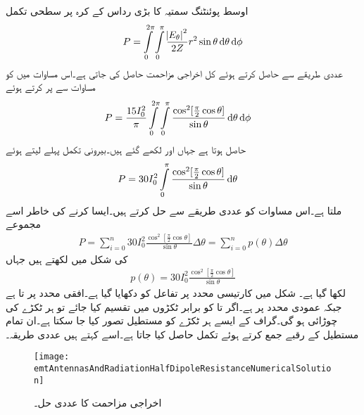 اوسط پوئنٹنگ سمتیہ کا بڑی رداس کے کرہ پر سطحی تکمل
\begin{align}
P=\int \limits_{0}^{2\pi}\int \limits_{0}^{\pi}  \frac{\abs{E_{\theta}}^2}{2 Z} r^2 \sin \theta \dif \theta \dif \phi
\end{align}
عددی طریقے سے حاصل کرتے ہوئے کل اخراجی مزاحمت   حاصل کی جاتی ہے۔اس مساوات میں  کو مساوات  سے پر کرتے ہوئے 
\begin{align*}
P&= \frac{15 I_0^2}{\pi}\int \limits_{0}^{2\pi}\int \limits_{0}^{\pi}  \frac{\cos^2 [\frac{\pi}{2} \cos \theta]}{\sin \theta} \dif \theta \dif \phi
\end{align*}
حاصل ہوتا ہے جہاں  اور  لکھے گئے ہیں۔بیرونی تکمل پہلے لیتے ہوئے
\begin{align}\label{مساوات_اینٹینا_نصف_طول_موج_اخراجی_طاقت_الف}
P&= 30 I_0^2\int \limits_{0}^{\pi}  \frac{\cos^2 [\frac{\pi}{2} \cos \theta]}{\sin \theta} \dif \theta
\end{align}
ملتا ہے۔اس مساوات کو عددی طریقے سے حل کرتے ہیں۔ایسا کرنے کی خاطر اسے مجموعے
\begin{align}
P=\sum_{i=0}^{n} 30 I_0^2  \frac{\cos^2 [\frac{\pi}{2} \cos \theta]}{\sin \theta} \Delta  \theta =\sum_{i=0}^{n} p(\theta) \Delta \theta
\end{align}
کی شکل میں لکھتے ہیں جہاں
\begin{align}\label{مساوات_اینٹینا_اخراجی_مزاحمت_عددی_الف}
p(\theta)=30 I_0^2  \frac{\cos^2 [\frac{\pi}{2} \cos \theta]}{\sin \theta}
\end{align}
لکھا گیا ہے۔ شکل  میں کارتیسی محدد پر  تفاعل   کو دکھایا گیا ہے۔افقی محدد پر  تا  ہے  جبکہ عمودی محدد پر  ہے۔اگر  تا  کو  برابر ٹکڑوں میں تقسیم کیا جائے تو ہر ٹکڑے کی چوڑائی  ہو گی۔گراف کے ایسے ہر ٹکڑے کو مستطیل تصور کیا جا سکتا ہے۔ان تمام مستطیل کے رقبے جمع کرتے ہوئے تکمل حاصل کیا جاتا ہے۔اسے کہتے ہیں عددی طریقہ۔
\begin{figure}
\centering
\texttt{[image: emtAntennasAndRadiationHalfDipoleResistanceNumericalSolution]}
\caption{اخراجی مزاحمت کا عددی حل۔}
\label{شکل_اینٹینا_اخراجی_مزاحمت_عددی_حل}
\end{figure}


